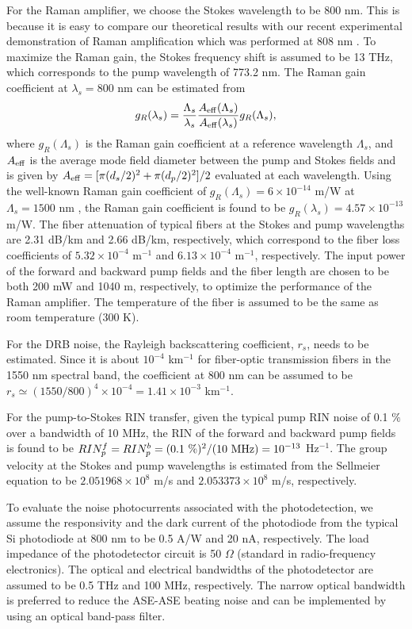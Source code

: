 \documentclass[10pt,letterpaper]{article}
\begin{document}
For the Raman amplifier, we choose the Stokes wavelength to be 800 nm. This is because it is easy to compare our theoretical results with our recent experimental demonstration of Raman amplification which was performed at 808 nm \cite{goda2009applphyslett}. To maximize the Raman gain, the Stokes frequency shift is assumed to be 13 THz, which corresponds to the pump wavelength of 773.2 nm. The Raman gain coefficient at $\lambda_s=800$ nm can be estimated from \cite{rottwitt2003jlightwavetechnol}
\begin{equation}
g_R(\lambda_s)=\frac{\Lambda_s}{\lambda_s}\frac{A_{\rm eff}(\Lambda_s)}{A_{\rm eff}(\lambda_s)}g_R(\Lambda_s),
\end{equation}
where $g_R(\Lambda_s)$ is the Raman gain coefficient at a reference wavelength $\Lambda_s$, and $A_{\rm eff}$ is the average mode field diameter between the pump and Stokes fields and is given by $A_{\rm eff}=[\pi(d_s/2)^2+\pi(d_p/2)^2]/2$ evaluated at each wavelength. Using the well-known Raman gain coefficient of $g_R(\Lambda_s)= 6 \times 10^{-14}$ m/W at $\Lambda_s = 1500$ nm \cite{islam2002ieee}, the Raman gain coefficient is found to be $g_R(\lambda_s) =  4.57 \times 10^{-13}$ m/W. The fiber attenuation of typical fibers at the Stokes and pump wavelengths are 2.31 dB/km and 2.66 dB/km, respectively, which correspond to the fiber loss coefficients of $5.32 \times 10^{-4}$ m$^{-1}$ and $6.13 \times 10^{-4}$ m$^{-1}$, respectively. The input power of the forward and backward pump fields and the fiber length are chosen to be both 200 mW and 1040 m, respectively, to optimize the performance of the Raman amplifier. The temperature of the fiber is assumed to be the same as room temperature (300 K). 

For the DRB noise, the Rayleigh backscattering coefficient, $r_s$, needs to be estimated. Since it is about $10^{-4}$ km$^{-1}$ for fiber-optic transmission fibers in the 1550 nm spectral band, the coefficient at 800 nm can be assumed to be $r_s \simeq (1550/800)^4 \times 10^{-4} = 1.41 \times 10^{-3}$ km$^{-1}$. 

For the pump-to-Stokes RIN transfer, given the typical pump RIN noise of 0.1 $\%$ over a bandwidth of 10 MHz, the RIN of the forward and backward pump fields is found to be $RIN_p^f = RIN_p^b = (0.1~\%)^2/(10 ~{\rm MHz}) = 10^{-13}$ Hz$^{-1}$. The group velocity at the Stokes and pump wavelengths is estimated from the Sellmeier equation to be $2.051968 \times 10^8$ m/s and $2.053373 \times 10^8$ m/s, respectively.

To evaluate the noise photocurrents associated with the photodetection, we assume the responsivity and the dark current of the photodiode from the typical Si photodiode at 800 nm to be 0.5 A/W and 20 nA, respectively. The load impedance of the photodetector circuit is 50 $\Omega$ (standard in radio-frequency electronics). The optical and electrical bandwidths of the photodetector are assumed to be 0.5 THz and 100 MHz, respectively. The narrow optical bandwidth is preferred to reduce the ASE-ASE beating noise and can be implemented by using an optical band-pass filter.
\end{document}
